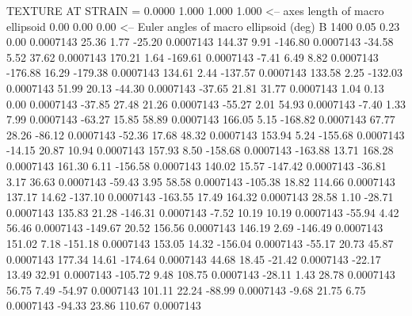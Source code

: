 TEXTURE AT STRAIN =    0.0000
   1.000   1.000   1.000  <-- axes length of macro ellipsoid
    0.00    0.00    0.00  <-- Euler angles of macro ellipsoid (deg)
B      1400
        0.05        0.23        0.00     0.0007143
       25.36        1.77      -25.20     0.0007143
      144.37        9.91     -146.80     0.0007143
      -34.58        5.52       37.62     0.0007143
      170.21        1.64     -169.61     0.0007143
       -7.41        6.49        8.82     0.0007143
     -176.88       16.29     -179.38     0.0007143
      134.61        2.44     -137.57     0.0007143
      133.58        2.25     -132.03     0.0007143
       51.99       20.13      -44.30     0.0007143
      -37.65       21.81       31.77     0.0007143
        1.04        0.13        0.00     0.0007143
      -37.85       27.48       21.26     0.0007143
      -55.27        2.01       54.93     0.0007143
       -7.40        1.33        7.99     0.0007143
      -63.27       15.85       58.89     0.0007143
      166.05        5.15     -168.82     0.0007143
       67.77       28.26      -86.12     0.0007143
      -52.36       17.68       48.32     0.0007143
      153.94        5.24     -155.68     0.0007143
      -14.15       20.87       10.94     0.0007143
      157.93        8.50     -158.68     0.0007143
     -163.88       13.71      168.28     0.0007143
      161.30        6.11     -156.58     0.0007143
      140.02       15.57     -147.42     0.0007143
      -36.81        3.17       36.63     0.0007143
      -59.43        3.95       58.58     0.0007143
     -105.38       18.82      114.66     0.0007143
      137.17       14.62     -137.10     0.0007143
     -163.55       17.49      164.32     0.0007143
       28.58        1.10      -28.71     0.0007143
      135.83       21.28     -146.31     0.0007143
       -7.52       10.19       10.19     0.0007143
      -55.94        4.42       56.46     0.0007143
     -149.67       20.52      156.56     0.0007143
      146.19        2.69     -146.49     0.0007143
      151.02        7.18     -151.18     0.0007143
      153.05       14.32     -156.04     0.0007143
      -55.17       20.73       45.87     0.0007143
      177.34       14.61     -174.64     0.0007143
       44.68       18.45      -21.42     0.0007143
      -22.17       13.49       32.91     0.0007143
     -105.72        9.48      108.75     0.0007143
      -28.11        1.43       28.78     0.0007143
       56.75        7.49      -54.97     0.0007143
      101.11       22.24      -88.99     0.0007143
       -9.68       21.75        6.75     0.0007143
      -94.33       23.86      110.67     0.0007143
